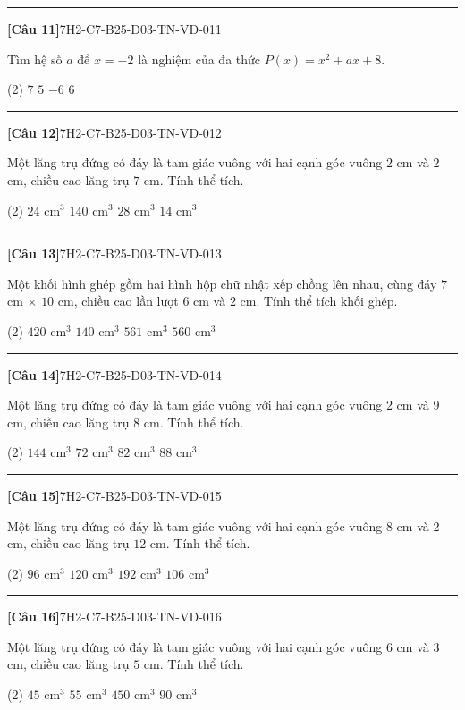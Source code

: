 \documentclass[12pt,a4paper]{article}
\newif\ifloigiai
\newenvironment{cauhoi}[2]{%
  \par\medskip\noindent\rule{\textwidth}{0.4pt}\par\nopagebreak
  \noindent\textbf{[#1]}\hfill{\scriptsize\ttfamily #2}\par\nopagebreak\smallskip}{\par}
\newcommand{\dapan}[1]{\ifloigiai\par\smallskip\noindent\textit{Đáp án:} \textbf{#1}\par\fi}
\begin{document}
\begin{cauhoi}{Câu 11}{7H2-C7-B25-D03-TN-VD-011}
Tìm hệ số $a$ để $x=-2$ là nghiệm của đa thức $P(x)=x^{2}+ax+8$.
\begin{tasks}(2)
\task $7$
\task $5$
\task $-6$
\task $6$
\end{tasks}
\dapan{D}
\end{cauhoi}
\begin{cauhoi}{Câu 12}{7H2-C7-B25-D03-TN-VD-012}
Một lăng trụ đứng có đáy là tam giác vuông với hai cạnh góc vuông $2$ cm và $2$ cm, chiều cao lăng trụ $7$ cm. Tính thể tích.
\begin{tasks}(2)
\task $24\text{ cm}^3$
\task $140\text{ cm}^3$
\task $28\text{ cm}^3$
\task $14\text{ cm}^3$
\end{tasks}
\dapan{D}
\end{cauhoi}
\begin{cauhoi}{Câu 13}{7H2-C7-B25-D03-TN-VD-013}
Một khối hình ghép gồm hai hình hộp chữ nhật xếp chồng lên nhau, cùng đáy $7$ cm $\times$ $10$ cm, chiều cao lần lượt $6$ cm và $2$ cm. Tính thể tích khối ghép.
\begin{tasks}(2)
\task $420\text{ cm}^3$
\task $140\text{ cm}^3$
\task $561\text{ cm}^3$
\task $560\text{ cm}^3$
\end{tasks}
\dapan{D}
\end{cauhoi}
\begin{cauhoi}{Câu 14}{7H2-C7-B25-D03-TN-VD-014}
Một lăng trụ đứng có đáy là tam giác vuông với hai cạnh góc vuông $2$ cm và $9$ cm, chiều cao lăng trụ $8$ cm. Tính thể tích.
\begin{tasks}(2)
\task $144\text{ cm}^3$
\task $72\text{ cm}^3$
\task $82\text{ cm}^3$
\task $88\text{ cm}^3$
\end{tasks}
\dapan{B}
\end{cauhoi}
\begin{cauhoi}{Câu 15}{7H2-C7-B25-D03-TN-VD-015}
Một lăng trụ đứng có đáy là tam giác vuông với hai cạnh góc vuông $8$ cm và $2$ cm, chiều cao lăng trụ $12$ cm. Tính thể tích.
\begin{tasks}(2)
\task $96\text{ cm}^3$
\task $120\text{ cm}^3$
\task $192\text{ cm}^3$
\task $106\text{ cm}^3$
\end{tasks}
\dapan{A}
\end{cauhoi}
\begin{cauhoi}{Câu 16}{7H2-C7-B25-D03-TN-VD-016}
Một lăng trụ đứng có đáy là tam giác vuông với hai cạnh góc vuông $6$ cm và $3$ cm, chiều cao lăng trụ $5$ cm. Tính thể tích.
\begin{tasks}(2)
\task $45\text{ cm}^3$
\task $55\text{ cm}^3$
\task $450\text{ cm}^3$
\task $90\text{ cm}^3$
\end{tasks}
\dapan{A}
\end{cauhoi}
\end{document}
